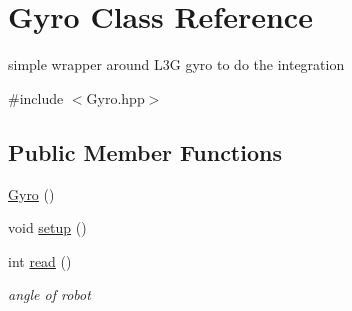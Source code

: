 \hypertarget{classGyro}{\section{Gyro Class Reference}
\label{classGyro}
}


simple wrapper around L3\-G gyro to do the integration  




{\ttfamily \#include $<$Gyro.\-hpp$>$}

\subsection*{Public Member Functions}
\begin{DoxyCompactItemize}
\item 
\hyperlink{classGyro_a8ff2fdb2417c677f4694fa23fc0ce6da}{Gyro} ()
\item 
void \hyperlink{classGyro_aab09f758425de1758f284853712cb18b}{setup} ()
\item 
int \hyperlink{classGyro_a8bf35077e5f6237629e093c67a0bb1d9}{read} ()
\begin{DoxyCompactList}\small\item\em angle of robot \end{DoxyCompactList}\end{DoxyCompactItemize}
